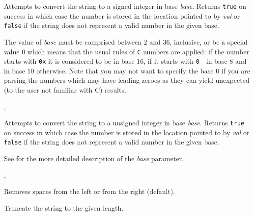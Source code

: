 Attempts to convert the string to a signed integer in base {\it base}. Returns
{\tt true} on success in which case the number is stored in the location
pointed to by {\it val} or {\tt false} if the string does not represent a
valid number in the given base.

The value of {\it base} must be comprised between $2$ and $36$, inclusive, or
be a special value $0$ which means that the usual rules of {\tt C} numbers are
applied: if the number starts with {\tt 0x} it is considered to be in base
$16$, if it starts with {\tt 0} - in base $8$ and in base $10$ otherwise. Note
that you may not want to specify the base $0$ if you are parsing the numbers
which may have leading zeroes as they can yield unexpected (to the user not
familiar with C) results.


,\\

\label{wxstringtoulong}


Attempts to convert the string to a unsigned integer in base {\it base}.
Returns {\tt true} on success in which case the number is stored in the
location pointed to by {\it val} or {\tt false} if the string does not
represent a valid number in the given base.

See  for the more detailed
description of the {\it base} parameter.


,\\

\label{wxstringtrim}


Removes spaces from the left or from the right (default).

\label{wxstringtruncate}


Truncate the string to the given length.

\label{wxstringungetwritebuf}

